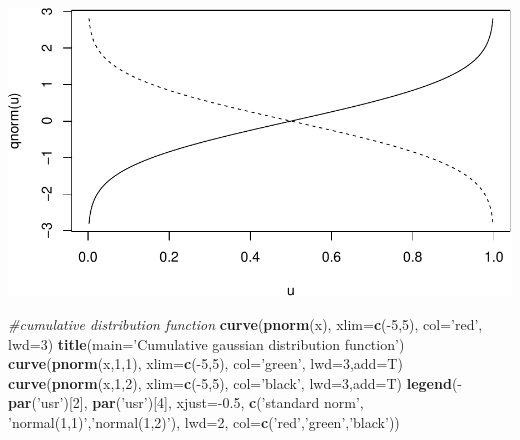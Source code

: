 \documentclass[]{article}
\newenvironment{Shaded}{\begin{snugshade}}{\end{snugshade}}
\newcommand{\KeywordTok}[1]{\textcolor[rgb]{0.13,0.29,0.53}{\textbf{{#1}}}}
\newcommand{\DataTypeTok}[1]{\textcolor[rgb]{0.13,0.29,0.53}{{#1}}}
\newcommand{\DecValTok}[1]{\textcolor[rgb]{0.00,0.00,0.81}{{#1}}}
\newcommand{\FloatTok}[1]{\textcolor[rgb]{0.00,0.00,0.81}{{#1}}}
\newcommand{\StringTok}[1]{\textcolor[rgb]{0.31,0.60,0.02}{{#1}}}
\newcommand{\CommentTok}[1]{\textcolor[rgb]{0.56,0.35,0.01}{\textit{{#1}}}}
\newcommand{\NormalTok}[1]{{#1}}
\begin{document}
\includegraphics{probability_files/figure-latex/unnamed-chunk-17-2.pdf}

\begin{Shaded}
\begin{Highlighting}[]
\CommentTok{#cumulative distribution function}
\KeywordTok{curve}\NormalTok{(}\KeywordTok{pnorm}\NormalTok{(x), }\DataTypeTok{xlim=}\KeywordTok{c}\NormalTok{(-}\DecValTok{5}\NormalTok{,}\DecValTok{5}\NormalTok{), }\DataTypeTok{col=}\StringTok{'red'}\NormalTok{, }\DataTypeTok{lwd=}\DecValTok{3}\NormalTok{)}
\KeywordTok{title}\NormalTok{(}\DataTypeTok{main=}\StringTok{'Cumulative gaussian distribution function'}\NormalTok{)}
\KeywordTok{curve}\NormalTok{(}\KeywordTok{pnorm}\NormalTok{(x,}\DecValTok{1}\NormalTok{,}\DecValTok{1}\NormalTok{), }\DataTypeTok{xlim=}\KeywordTok{c}\NormalTok{(-}\DecValTok{5}\NormalTok{,}\DecValTok{5}\NormalTok{), }\DataTypeTok{col=}\StringTok{'green'}\NormalTok{, }\DataTypeTok{lwd=}\DecValTok{3}\NormalTok{,}\DataTypeTok{add=}\NormalTok{T)}
\KeywordTok{curve}\NormalTok{(}\KeywordTok{pnorm}\NormalTok{(x,}\DecValTok{1}\NormalTok{,}\DecValTok{2}\NormalTok{),  }\DataTypeTok{xlim=}\KeywordTok{c}\NormalTok{(-}\DecValTok{5}\NormalTok{,}\DecValTok{5}\NormalTok{), }\DataTypeTok{col=}\StringTok{'black'}\NormalTok{, }\DataTypeTok{lwd=}\DecValTok{3}\NormalTok{,}\DataTypeTok{add=}\NormalTok{T)}
\KeywordTok{legend}\NormalTok{(-}\KeywordTok{par}\NormalTok{(}\StringTok{'usr'}\NormalTok{)[}\DecValTok{2}\NormalTok{], }\KeywordTok{par}\NormalTok{(}\StringTok{'usr'}\NormalTok{)[}\DecValTok{4}\NormalTok{], }\DataTypeTok{xjust=}\NormalTok{-}\FloatTok{0.5}\NormalTok{,}
       \KeywordTok{c}\NormalTok{(}\StringTok{'standard norm'}\NormalTok{, }\StringTok{'normal(1,1)'}\NormalTok{,}\StringTok{'normal(1,2)'}\NormalTok{),}
       \DataTypeTok{lwd=}\DecValTok{2}\NormalTok{, }\DataTypeTok{col=}\KeywordTok{c}\NormalTok{(}\StringTok{'red'}\NormalTok{,}\StringTok{'green'}\NormalTok{,}\StringTok{'black'}\NormalTok{))}
\end{Highlighting}
\end{Shaded}
\end{document}
